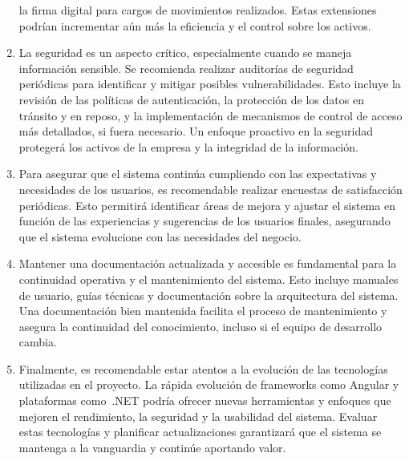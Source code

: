 \documentclass[stu, 12pt, letterpaper, donotrepeattitle, floatsintext, natbib]{apa7}
\begin{document}
\begin{enumerate}
          la firma digital para cargos de movimientos realizados. Estas extensiones podrían incrementar aún más la eficiencia y el control sobre los
          activos.
    \item %
          La seguridad es un aspecto crítico, especialmente cuando se maneja información sensible. Se recomienda realizar auditorías de seguridad
          periódicas para identificar y mitigar posibles vulnerabilidades. Esto incluye la revisión de las políticas de autenticación, la protección de
          los datos en tránsito y en reposo, y la implementación de mecanismos de control de acceso más detallados, si fuera necesario. Un enfoque
          proactivo en la seguridad protegerá los activos de la empresa y la integridad de la información.
    \item %
          Para asegurar que el sistema continúa cumpliendo con las expectativas y necesidades de los usuarios, es recomendable realizar encuestas de
          satisfacción periódicas. Esto permitirá identificar áreas de mejora y ajustar el sistema en función de las experiencias y sugerencias de los
          usuarios finales, asegurando que el sistema evolucione con las necesidades del negocio.
    \item %
          Mantener una documentación actualizada y accesible es fundamental para la continuidad operativa y el mantenimiento del sistema. Esto incluye
          manuales de usuario, guías técnicas y documentación sobre la arquitectura del sistema. Una documentación bien mantenida facilita el proceso
          de mantenimiento y asegura la continuidad del conocimiento, incluso si el equipo de desarrollo cambia.
    \item %
          Finalmente, es recomendable estar atentos a la evolución de las tecnologías utilizadas en el proyecto. La rápida evolución de frameworks como
          Angular y plataformas como~.NET podría ofrecer nuevas herramientas y enfoques que mejoren el rendimiento, la seguridad y la usabilidad del
          sistema. Evaluar estas tecnologías y planificar actualizaciones garantizará que el sistema se mantenga a la vanguardia y continúe aportando
          valor.
\end{enumerate}
\end{document}
